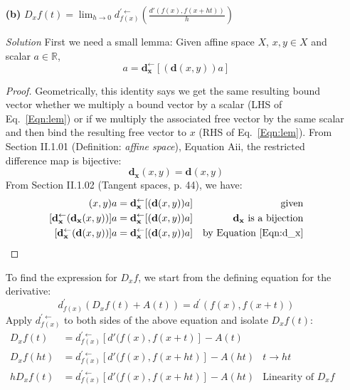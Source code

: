 \documentclass[11pt]{article}
\begin{document}
\begin{itemize}
\item[\textbf{(b)}] $D_xf(t) = \lim_{h \to 0} d^{\prime\leftarrow}_{f(x)}(\frac{d'(f(x),f(x+ht))}{h})$
\item[\emph{Solution}] First we need a small lemma:  Given affine space
  $X$, $x,y \in X$ and scalar $a \in \mathbb{R}$,
  \begin{equation}
    [\mathbf{d_x^\leftarrow}(\mathbf{d}(x,y))]a = \mathbf{d_x^\leftarrow}[(\mathbf{d}(x,y))a]
    \label{Eqn:lem}
  \end{equation}
  \begin{proof}
    Geometrically, this identity says we get the same resulting bound vector
    whether we multiply a bound vector by a scalar (LHS of Eq.~\ref{Eqn:lem}) or
    if we multiply the associated free vector by the same scalar and then bind
    the resulting free vector to $x$ (RHS of Eq.~\ref{Eqn:lem}).  From Section
    II.1.01 (Definition: \emph{affine space}), Equation Aii, the restricted
    difference map is bijective:
    \begin{equation}
      \mathbf{d_x}(x,y) = \mathbf{d}(x,y)
      \label{Eqn:d_x}
    \end{equation}
    From Section II.1.02 (Tangent spaces, p. 44), we have:
    \begin{align*}
      (x,y)a &= \mathbf{d_x^{\leftarrow}}[(\mathbf{d}(x,y))a] & \text{given} &\\
      [\mathbf{d_x^\leftarrow}(\mathbf{d_x}(x,y))]a &=
      \mathbf{d_x^\leftarrow}[(\mathbf{d}(x,y))a] & \mathbf{d_x} \text{ is a bijection} & \\
      [\mathbf{d_x^\leftarrow}(\mathbf{d}(x,y))]a &=
      \mathbf{d_x^\leftarrow}[(\mathbf{d}(x,y))a] & \text{by Equation~\ref{Eqn:d_x}} & \\
    \end{align*}
  \end{proof}
  To find the expression for $D_xf$, we start from the defining equation for the
  derivative:
  \begin{equation}
    d^\prime_{f(x)}(D_xf(t) + A(t)) = d^\prime(f(x),f(x+t))
  \end{equation}
  Apply $d^{\prime\leftarrow}_{f(x)}$ to both sides of the above equation and
  isolate $D_xf(t)$:
  \begin{align*}
    D_xf(t)  &= d^{\prime\leftarrow}_{f(x)}[d'(f(x),f(x+t)] - A(t)   &          &\\
    D_xf(ht) &= d^{\prime\leftarrow}_{f(x)}[d'(f(x),f(x+ht)] - A(ht) & t \to ht &\\
    hD_xf(t) &= d^{\prime\leftarrow}_{f(x)}[d'(f(x),f(x+ht)] - A(ht) & \text{Linearity of } D_xf &\\

\end{align*}
\end{itemize}
\end{document}
